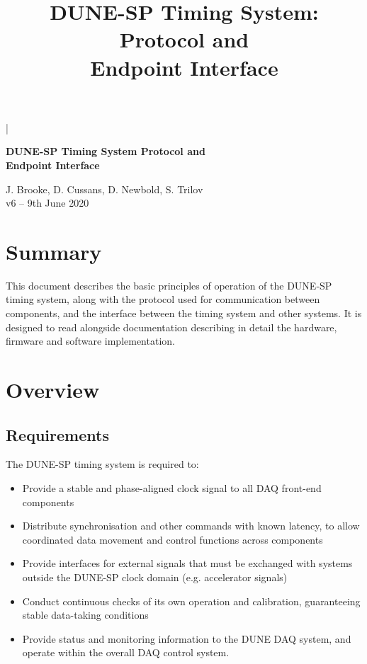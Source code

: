\documentclass{dune}
\begin{document}

\lstMakeShortInline[columns=fixed]|

\title{DUNE-SP Timing System: Protocol and\\ Endpoint Interface}
\begin{center}
{\LARGE\bf DUNE-SP Timing System Protocol and\\ Endpoint Interface}
\vspace{1cm}

J. Brooke, D. Cussans, D. Newbold, S. Trilov \\
\vspace*{1ex}
v6 -- 9th June 2020
\end{center}
\vspace*{\fill}
\setcounter{tocdepth}{1}
\tableofcontents
\vspace*{\fill}

\section*{Summary}

This document describes the basic principles of operation of the DUNE-SP timing system, along with the protocol used for communication between components, and the interface between the timing system and other systems. It is designed to read alongside documentation describing in detail the hardware, firmware and software implementation.

\newpage
\section{Overview}
\subsection{Requirements}

The DUNE-SP timing system is required to:
\begin{itemize}
	\item Provide a stable and phase-aligned clock signal to all DAQ front-end components
	\item Distribute synchronisation and other commands with known latency, to allow coordinated data movement and control functions across components
	\item Provide interfaces for external signals that must be exchanged with systems outside the DUNE-SP clock domain (e.g. accelerator signals)
	\item Conduct continuous checks of its own operation and calibration, guaranteeing stable data-taking conditions
	\item Provide status and monitoring information to the DUNE DAQ system, and operate within the overall DAQ control system.
\end{itemize}
\end{document}
